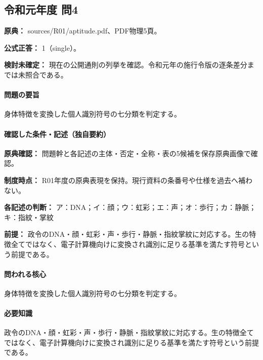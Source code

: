 \subsection{令和元年度 問4}
\label{q:r01-reg-apt-04}

\noindent\textbf{原典：} sources/R01/aptitude.pdf、PDF物理5頁。

\textbf{公式正答：} 1（single）。

\par\textbf{検討未確定：} 現在の公開通則の列挙を確認。令和元年の施行令版の逐条差分までは未照合である。

\paragraph{問題の要旨} 身体特徴を変換した個人識別符号の七分類を判定する。

\paragraph{確認した条件・記述（独自要約）}\mbox{}\par

\noindent\textbf{原典確認：} 問題幹と各記述の主体・否定・全称・表の5候補を保存原典画像で確認。\par

\noindent\textbf{制度時点：} R01年度の原典表現を保持。現行資料の条番号や仕様を過去へ補わない。\par

\noindent\textbf{各記述の判断：} ア：DNA；イ：顔；ウ：虹彩；エ：声；オ：歩行；カ：静脈；キ：指紋・掌紋\par

\noindent\textbf{前提：} 政令のDNA・顔・虹彩・声・歩行・静脈・指紋掌紋に対応する。生の特徴全てではなく、電子計算機向けに変換され識別に足りる基準を満たす符号という前提である。\par

\paragraph{問われる核心} 身体特徴を変換した個人識別符号の七分類を判定する。

\paragraph{必要知識} 政令のDNA・顔・虹彩・声・歩行・静脈・指紋掌紋に対応する。生の特徴全てではなく、電子計算機向けに変換され識別に足りる基準を満たす符号という前提である。

